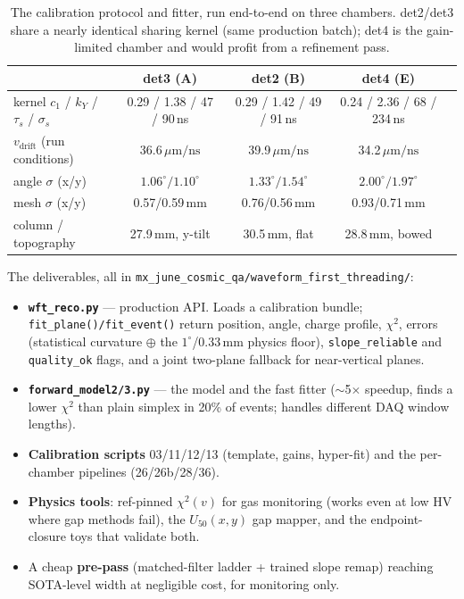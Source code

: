 \documentclass[11pt,a4paper]{article}
\newcommand{\um}{\,\mu\mathrm{m/ns}}
\begin{document}
\begin{table}[htb]
\centering\small
\begin{tabular}{lcccc}
\toprule
 & det3 (A) & det2 (B) & det4 (E) \\
\midrule
kernel $c_1$ / $k_Y$ / $\tau_s$ / $\sigma_s$ & 0.29 / 1.38 / 47 / 90\,ns & 0.29 / 1.42 / 49 / 91\,ns & 0.24 / 2.36 / 68 / 234\,ns\\
$v_\mathrm{drift}$ (run conditions) & 36.6$\um$ & 39.9$\um$ & 34.2$\um$\\
angle $\sigma$ (x/y) & $1.06^\circ/1.10^\circ$ & $1.33^\circ/1.54^\circ$ & $2.00^\circ/1.97^\circ$\\
mesh $\sigma$ (x/y) & 0.57/0.59\,mm & 0.76/0.56\,mm & 0.93/0.71\,mm\\
column / topography & 27.9\,mm, y-tilt & 30.5\,mm, flat & 28.8\,mm, bowed\\
\bottomrule
\end{tabular}
\caption{The calibration protocol and fitter, run end-to-end on three chambers.
det2/det3 share a nearly identical sharing kernel (same production batch);
det4 is the gain-limited chamber and would profit from a refinement pass.}
\label{tab:fleet}
\end{table}

\noindent The deliverables, all in
\texttt{mx\_june\_cosmic\_qa/waveform\_first\_threading/}:
\begin{itemize}\itemsep2pt
\item \textbf{\texttt{wft\_reco.py}} --- production API. Loads a calibration
bundle; \texttt{fit\_plane()/fit\_event()} return position, angle, charge
profile, $\chi^2$, errors (statistical curvature $\oplus$ the $1^\circ$/0.33\,mm
physics floor), \texttt{slope\_reliable} and \texttt{quality\_ok} flags, and a
joint two-plane fallback for near-vertical planes.
\item \textbf{\texttt{forward\_model2/3.py}} --- the model and the fast fitter
($\sim$5$\times$ speedup, finds a lower $\chi^2$ than plain simplex in 20\% of
events; handles different DAQ window lengths).
\item \textbf{Calibration scripts} 03/11/12/13 (template, gains, hyper-fit) and
the per-chamber pipelines (26/26b/28/36).
\item \textbf{Physics tools}: ref-pinned $\chi^2(v)$ for gas monitoring
(works even at low HV where gap methods fail), the $U_{50}(x,y)$ gap mapper,
and the endpoint-closure toys that validate both.
\item A cheap \textbf{pre-pass} (matched-filter ladder + trained slope remap)
reaching SOTA-level width at negligible cost, for monitoring only.
\end{itemize}
\end{document}
